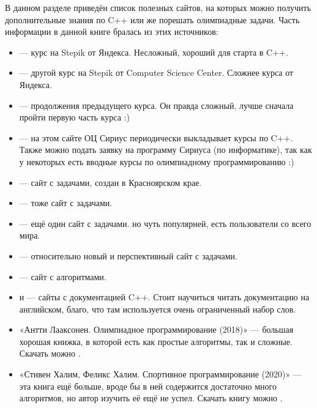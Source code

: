 \hypertarget{0.5}{}
В данном разделе приведён список полезных сайтов, на которых можно получить дополнительные знания по C++ или же порешать олимпиадные задачи. Часть информации в данной книге бралась из этих источников:

\begin{itemize}
    \item {} — курс на Stepik от Яндекса. Несложный, хороший для старта в C++.
    \item {} — другой курс на Stepik от Computer Science Center. Сложнее курса от Яндекса.
    \item {} — продолжения предыдущего курса. Он правда сложный, лучше сначала пройти первую часть курса :)
    \item {} — на этом сайте ОЦ Сириус периодически выкладывает курсы по C++. Также можно подать заявку на программу Сириуса (по информатике), так как у некоторых есть вводные курсы по олимпиадному программированию :)
    \item {} — сайт с задачами, создан в Красноярском крае.
    \item {} — тоже сайт с задачами.
    \item {} — ещё один сайт с задачами. но чуть популярней, есть пользователи со всего мира.
    \item {} — относительно новый и перспективный сайт с задачами.
    \item {} — сайт с алгоритмами.
    \item {} и  — сайты с документацией C++. Стоит научиться читать документацию на английском, благо, что там используется очень ограниченный набор слов.
    \item «Антти Лааксонен. Олимпиадное программирование (2018)» — большая хорошая книжка, в которой есть как простые алгоритмы, так и сложные. Скачать можно .
    \item «Стивен Халим, Феликс Халим. Спортивное программирование (2020)» — эта книга ещё больше, вроде бы в ней содержится достаточно много алгоритмов, но автор изучить её ещё не успел. Скачать книгу можно .
\end{itemize}
